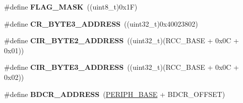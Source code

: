 \begin{DoxyCompactItemize}
\#define {\bfseries F\+L\+A\+G\+\_\+\+M\+A\+SK}~((uint8\+\_\+t)0x1\+F)
\item 
\mbox{\label{group___r_c_c_ga9b2724575bb34217aeddcb69c41a1547}} 
\#define {\bfseries C\+R\+\_\+\+B\+Y\+T\+E3\+\_\+\+A\+D\+D\+R\+E\+SS}~((uint32\+\_\+t)0x40023802)
\item 
\mbox{\label{group___r_c_c_gaab58c3f3f81bf1ab9a14cf3fececd8c4}} 
\#define {\bfseries C\+I\+R\+\_\+\+B\+Y\+T\+E2\+\_\+\+A\+D\+D\+R\+E\+SS}~((uint32\+\_\+t)(R\+C\+C\+\_\+\+B\+A\+SE + 0x0\+C + 0x01))
\item 
\mbox{\label{group___r_c_c_ga43f47430582c9575970901533e525bb5}} 
\#define {\bfseries C\+I\+R\+\_\+\+B\+Y\+T\+E3\+\_\+\+A\+D\+D\+R\+E\+SS}~((uint32\+\_\+t)(R\+C\+C\+\_\+\+B\+A\+SE + 0x0\+C + 0x02))
\item 
\mbox{\label{group___r_c_c_ga40b5a415d697b6af7babd8a208c92435}} 
\#define {\bfseries B\+D\+C\+R\+\_\+\+A\+D\+D\+R\+E\+SS}~(\hyperlink{group___peripheral__memory__map_ga9171f49478fa86d932f89e78e73b88b0}{P\+E\+R\+I\+P\+H\+\_\+\+B\+A\+SE} + B\+D\+C\+R\+\_\+\+O\+F\+F\+S\+ET)
\end{DoxyCompactItemize}
